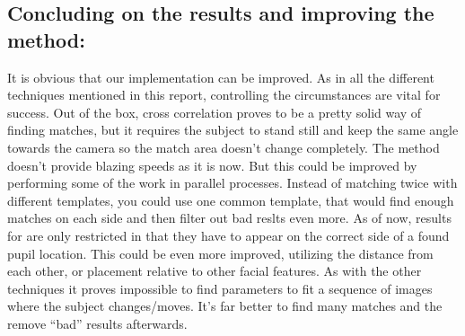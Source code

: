 \subsection{Concluding on the results and improving the method:}

It is obvious that our implementation can be improved. As in all the
different techniques mentioned in this report, controlling the
circumstances are vital for success. Out of the box, cross correlation
proves to be a pretty solid way of finding matches, but it requires the
subject to stand still and keep the same angle towards the camera so the
match area doesn't change completely. The method doesn't provide blazing
speeds as it is now. But this could be improved by performing some of
the work in parallel processes. Instead of matching twice with different
templates, you could use one common template, that would find enough
matches on each side and then filter out bad reslts even more. As of
now, results for are only restricted in that they have to appear on the
correct side of a found pupil location. This could be even more
improved, utilizing the distance from each other, or placement relative
to other facial features. As with the other techniques it proves
impossible to find parameters to fit a sequence of images where the
subject changes/moves. It's far better to find many matches and the
remove ``bad'' results afterwards.
